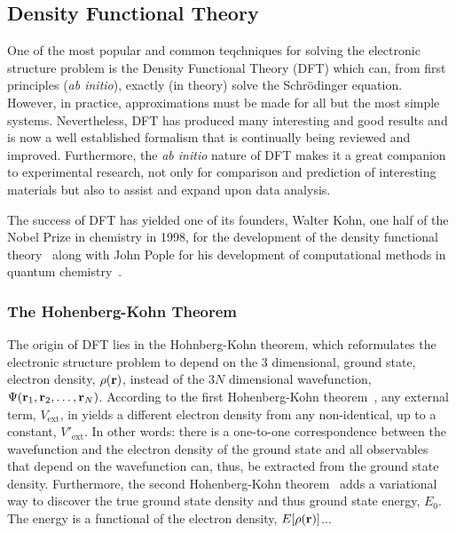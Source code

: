 \subsection{Density Functional Theory}
\label{sec:methods-dft}
One of the most popular and common teqchniques for solving the electronic structure problem is the Density Functional Theory (DFT) which can, from first principles (\textit{ab initio}), exactly (in theory) solve the Schr\"odinger equation.
However, in practice, approximations must be made for all but the most simple systems.
Nevertheless, DFT has produced many interesting and good results and is now a well established formalism that is continually being reviewed and improved.
Furthermore, the \textit{ab initio} nature of DFT makes it a great companion to experimental research, not only for comparison and prediction of interesting materials but also to assist and expand upon data analysis.

The success of DFT has yielded one of its founders, Walter Kohn, one half of the Nobel Prize in chemistry in 1998, for the development of the density functional theory~\cite{kohn1999} along with John Pople for his development of computational methods in quantum chemistry~\cite{pople1999}.

\subsubsection{The Hohenberg-Kohn Theorem}
The origin  of DFT lies in the Hohnberg-Kohn theorem, which reformulates the electronic structure problem to depend on the $3$ dimensional, ground state, electron density, $\rho({\mathrm{\mathbf{\bm{r}}}})$, instead of the $3N$ dimensional wavefunction, $\Psi({\mathrm{\mathbf{\bm{r}}}}_1, {\mathrm{\mathbf{\bm{r}}}}_2, \ldots, {\mathrm{\mathbf{\bm{r}}}}_N)$.
According to the first Hohenberg-Kohn theorem~\cite{hohenberg-kohn-1964}, any external term, $V_\text{ext}$, in  yields a different electron density from any non-identical, up to a constant, $V'_\text{ext}$.
In other words: there is a one-to-one correspondence between the wavefunction and the electron density of the ground state and all observables that depend on the wavefunction can, thus, be extracted from the ground state density.
Furthermore, the second Hohenberg-Kohn theorem~\cite{hohenberg-kohn-1964} adds a variational way to discover the true ground state density and thus ground state energy, $E_0$.
The energy is a functional of the electron density, $E[\rho({\mathrm{\mathbf{\bm{r}}}})]$...


